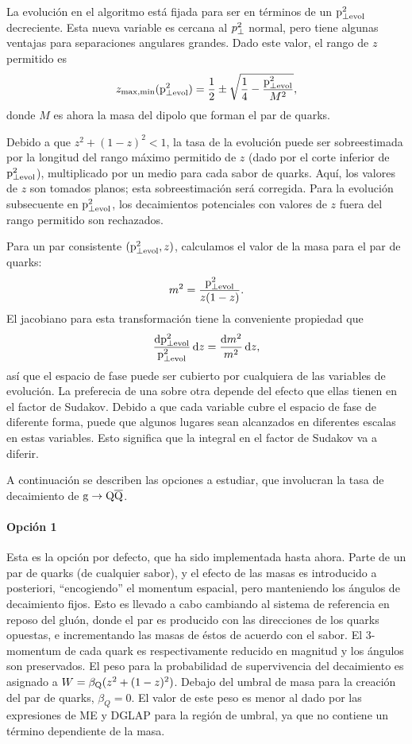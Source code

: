 \documentclass[a4paper,12pt]{article}
\begin{document}
La evolución en el algoritmo está fijada para ser en términos de un ${\mathrm p}^2_{\perp\mathrm{evol}}$ decreciente. Esta nueva variable es cercana al $p^2_{\perp}$ normal, pero tiene algunas ventajas para separaciones angulares grandes. Dado este valor, el rango de $z$ permitido es
\begin{equation}
z_{\mathrm{max,min}}({\mathrm p}^2_{\perp\mathrm{evol}}) = \frac{1}{2} \pm \sqrt{ \frac{1}{4}
 - \frac{{\mathrm p}^2_{\perp\mathrm{evol}}}{M^2}},
\end{equation}
donde $M$ es ahora la masa del dipolo que forman el par de quarks.

Debido a que $z^2+(1-z)^2<1$, la tasa de la evolución puede ser sobreestimada por la longitud del rango máximo permitido de $z$ (dado por el corte inferior de ${\mathrm p}^2_{\perp\mathrm{evol}}$), multiplicado por un medio para cada sabor de quarks. Aquí, los valores de $z$ son tomados planos; esta sobreestimación será corregida. Para la evolución subsecuente en ${\mathrm p}^2_{\perp\mathrm{evol}}$, los decaimientos potenciales con valores de $z$ fuera del rango permitido son rechazados.

Para un par consistente $({\mathrm p}^2_{\perp\mathrm{evol}},z)$, calculamos el valor de la masa para el par de quarks:
\begin{equation}
m^2 = \frac{{\mathrm p}^2_{\perp\mathrm{evol}}}{z(1-z)}.
\end{equation}
El jacobiano para esta transformación tiene la conveniente propiedad que
\begin{equation}
\frac{{\mathrm d}{\mathrm p}^2_{\perp\mathrm{evol}}}{{\mathrm p}^2_{\perp\mathrm{evol}}} \, {\mathrm d} z = \frac{{\mathrm d} m^2}{m^2} \, {\mathrm d} z,
\label{jacobian}
\end{equation}
así que el espacio de fase puede ser cubierto por cualquiera de las variables de evolución. La preferecia de una sobre otra depende del efecto que ellas tienen en el factor de Sudakov. Debido a que cada variable cubre el espacio de fase de diferente forma, puede que algunos lugares sean alcanzados en diferentes escalas en estas variables. Esto significa que la integral en el factor de Sudakov va a diferir.

A continuación se describen las opciones a estudiar, que involucran la tasa de decaimiento de ${\mathrm g}\to{\mathrm Q}\overline{\mathrm Q}$.

\paragraph{Opción 1}

Esta es la opción por defecto, que ha sido implementada hasta ahora. Parte de un par de quarks (de cualquier sabor), y el efecto de las masas es introducido a posteriori, ``encogiendo'' el momentum espacial, pero manteniendo los ángulos de decaimiento fijos. Esto es llevado a cabo cambiando al sistema de referencia en reposo del gluón, donde el par es producido con las direcciones de los quarks opuestas, e incrementando las masas de éstos de acuerdo con el sabor. El 3-momentum de cada quark es respectivamente reducido en magnitud y los ángulos son preservados. El peso para la probabilidad de supervivencia del decaimiento es asignado a $W=\beta_{\mathrm Q}(z^2+(1-z)^2)$. Debajo del umbral de masa para la creación del par de quarks, $\beta_Q=0$. El valor de este peso es menor al dado por las expresiones de ME y DGLAP para la región de umbral, ya que no contiene un término dependiente de la masa.
\end{document}

